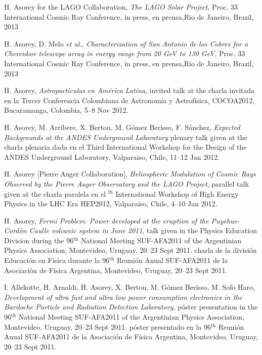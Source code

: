 \begin{etaremune}
\item {}H. Asorey for the LAGO Collaboration, {\emph{The LAGO Solar Project}}, \en Proc. 33 International Cosmic Ray Conference, \ifeng in press, \else en prensa,\fi  Rio de Janeiro, Brazil, 2013

\item {}H. Asorey, D. Melo {\emph{et al.}}, {\emph{Characterization of San Antonio de los Cobres for a Cherenkov telescope array in energy range from 20 GeV to 130 GeV}}, \en Proc. 33 International Cosmic Ray Conference, \ifeng in press, \else en prensa,\fi  Rio de Janeiro, Brazil, 2013

\item {} H. Asorey, {\emph{Astropartículas en América Latina}}, 
\ifeng
invited talk at the
\else
charla invitada en la 
\fi
Tercer Conferencia Colombiana de Astronomía y Astrofísica, COCOA2012, Bucaramanga, Colombia, 5--8 Nov 2012.

\item {} H. Asorey, M. Arribere, X. Bertou, M. Gómez Berisso, F. Sánchez,
{\emph{Expected Backgrounds at the ANDES Underground Laboratory}}
\ifeng
plenary talk given at the
\else
charla plenaria dada en el
\fi
Third International Workshop for the Design of the ANDES Underground Laboratory, Valparaiso, Chile, 11--12 Jan 2012.

\item {}H. Asorey [Pierre Auger Collaboration], {\emph{Heliospheric
Modulation of Cosmic Rays Observed by the Pierre Auger Observatory and the LAGO
Project}}, 
\ifeng
parallel talk given at the 
\else
charla paralela en el 
$^{\mathrm{th}}$ International Workshop of High Energy Physics in the LHC Era HEP2012, Valparaiso, Chile, 4--10 Jan 2012.

\item {}H. Asorey, {\emph{Fermi Problem: Power developed at the eruption of
the Puyehue-Cordón Caulle volcanic system in June 2011}}, 
\ifeng
talk given in the Physics Education Division during the 96$^{\mathrm{th}}$ National Meeting SUF-AFA2011 of the Argentinian Physics Association, Montevideo, Uruguay, 20--23 Sept 2011.
\else
charla de la división Educación en Física durante la 96$^{\mathrm{th}}$ Reunión Anual SUF-AFA2011 de la Asociación de Física Argentina, Montevideo, Uruguay, 20--23 Sept 2011.
\fi

\item {}I. Allekotte, H. Arnaldi, H. Asorey, X. Bertou, M. Gómez Berisso,
M. Sofo Haro, {\emph{Development of ultra fast and ultra low power consumption
electronics in the Bariloche Particle and Radiation Detection Laboratory}},
\ifeng
póster presentation in the 96$^{\mathrm{th}}$ National Meeting SUF-AFA2011 of the Argentinian Physics Association, Montevideo, Uruguay, 20--23 Sept 2011.
\else
póster presentado en la 96$^{\mathrm{th}}$ Reunión Anual SUF-AFA2011 de la Asociación de Física Argentina, Montevideo, Uruguay, 20--23 Sept 2011.
\fi


\end{etaremune}
